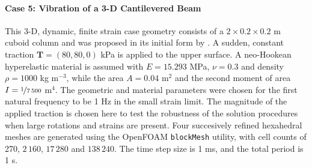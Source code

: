 \documentclass[sn-mathphys,Numbered]{sn-jnl}%
\newcommand{\bb}{\boldsymbol}
\begin{document}
\paragraph{Case 5: Vibration of a 3-D Cantilevered Beam}
This 3-D, dynamic, finite strain case geometry consists of a $2 \times 0.2 \times 0.2$ m cuboid column and was proposed in its initial form by \citet{Tukovic2007}.
A sudden, constant traction $\bb{T} = \left(80, 80, 0 \right)$ kPa is applied to the upper surface.
A neo-Hookean hyperelastic material is assumed with $E = 15.293$ MPa, $\nu = 0.3$ and density $\rho = 1000$ kg m$^{-3}$, while the area $A = 0.04$ m$^2$ and the second moment of area $I = \nicefrac{1}{7\,500}$ m$^4$. %
The geometric and material parameters were chosen for the first natural frequency to be 1 Hz in the small strain limit.
The magnitude of the applied traction is chosen here to test the robustness of the solution procedures when large rotations and strains are present.
Four succesively refined hexahedral meshes are generated using the OpenFOAM \texttt{blockMesh} utility, with cell counts of 270, $2\,160$, $17\,280$ and $138\,240$.
The time step size is 1 ms, and the total period is 1 s.
\end{document}
